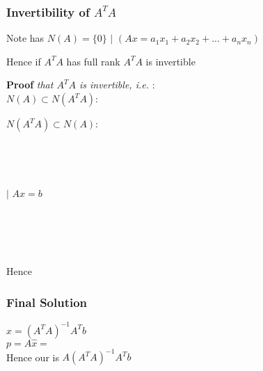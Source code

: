 \vsp

\subsubsection*{Invertibility of $A^T A$ }
Note  has  
\imp $N(A) = \{0\}$
\hspace{0.2cm} $|$  \hspace{0.2cm} $( Ax = a_1 x_1 + a_2 x_2 + ... + a_n x_n )$

Hence if  \imp $A^T A$ has full rank
\imp $A^T A$ is invertible

\vsp
\textbf{Proof} \textit{that $A^T A$ is invertible, i.e. }: \\
$N(A) \subset N(A^T A)$: \\

$N(A^T A) \subset N(A)$: \\
 \\
 \\
 \\
 \\
 \hsp $|$ \hsp $Ax = b$ \\
 \\
 \\
 \\
 \\

Hence 

\subsubsection*{Final Solution}
$\hat{x} = (A^T A)^{-1} A^T b$ \\
\imp $p = A\hat{x} =$  \\
Hence our  is $A(A^T A)^{-1} A^T b$